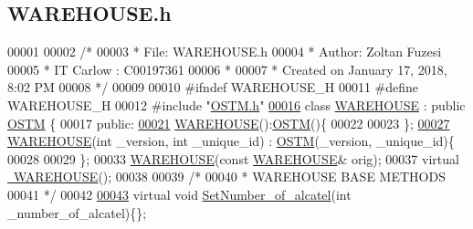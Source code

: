 \hypertarget{_w_a_r_e_h_o_u_s_e_8h_source}{}\subsection{W\+A\+R\+E\+H\+O\+U\+S\+E.\+h}

\begin{DoxyCode}
00001 
00002 \textcolor{comment}{/* }
00003 \textcolor{comment}{ * File:   WAREHOUSE.h}
00004 \textcolor{comment}{* Author: Zoltan Fuzesi}
00005 \textcolor{comment}{ * IT Carlow : C00197361}
00006 \textcolor{comment}{ *}
00007 \textcolor{comment}{ * Created on January 17, 2018, 8:02 PM}
00008 \textcolor{comment}{ */}
00009 
00010 \textcolor{preprocessor}{#ifndef WAREHOUSE\_H}
00011 \textcolor{preprocessor}{#define WAREHOUSE\_H}
00012 \textcolor{preprocessor}{#include "\hyperlink{_o_s_t_m_8h}{OSTM.h}"}
\hypertarget{_w_a_r_e_h_o_u_s_e_8h_source.tex_l00016}{}\hyperlink{class_w_a_r_e_h_o_u_s_e}{00016} \textcolor{keyword}{class }\hyperlink{class_w_a_r_e_h_o_u_s_e}{WAREHOUSE} : \textcolor{keyword}{public} \hyperlink{class_o_s_t_m}{OSTM} \{
00017 \textcolor{keyword}{public}:
\hypertarget{_w_a_r_e_h_o_u_s_e_8h_source.tex_l00021}{}\hyperlink{class_w_a_r_e_h_o_u_s_e_a7a924d389af91f54ed0e1d1d8d56ec57_a7a924d389af91f54ed0e1d1d8d56ec57}{00021}     \hyperlink{class_w_a_r_e_h_o_u_s_e_a7a924d389af91f54ed0e1d1d8d56ec57_a7a924d389af91f54ed0e1d1d8d56ec57}{WAREHOUSE}():\hyperlink{class_o_s_t_m}{OSTM}()\{
00022         
00023     \};
\hypertarget{_w_a_r_e_h_o_u_s_e_8h_source.tex_l00027}{}\hyperlink{class_w_a_r_e_h_o_u_s_e_a91a50ed8f6eeb344b1785f750532b18a_a91a50ed8f6eeb344b1785f750532b18a}{00027}     \hyperlink{class_w_a_r_e_h_o_u_s_e_a91a50ed8f6eeb344b1785f750532b18a_a91a50ed8f6eeb344b1785f750532b18a}{WAREHOUSE}(\textcolor{keywordtype}{int} \_version, \textcolor{keywordtype}{int} \_unique\_id) : \hyperlink{class_o_s_t_m}{OSTM}(\_version, \_unique\_id)\{
00028         
00029     \};
00033     \hyperlink{class_w_a_r_e_h_o_u_s_e_a7a924d389af91f54ed0e1d1d8d56ec57_a7a924d389af91f54ed0e1d1d8d56ec57}{WAREHOUSE}(\textcolor{keyword}{const} \hyperlink{class_w_a_r_e_h_o_u_s_e}{WAREHOUSE}& orig);
00037     \textcolor{keyword}{virtual} \hyperlink{class_w_a_r_e_h_o_u_s_e_ad5aa686839d7be9bfea33d469c58086b_ad5aa686839d7be9bfea33d469c58086b}{~WAREHOUSE}();
00038     
00039     \textcolor{comment}{/*}
00040 \textcolor{comment}{     * WAREHOUSE BASE METHODS}
00041 \textcolor{comment}{     */}
00042     
\hypertarget{_w_a_r_e_h_o_u_s_e_8h_source.tex_l00043}{}\hyperlink{class_w_a_r_e_h_o_u_s_e_a91b45d7d40a154308644a9f2b1767d28_a91b45d7d40a154308644a9f2b1767d28}{00043}     \textcolor{keyword}{virtual} \textcolor{keywordtype}{void} \hyperlink{class_w_a_r_e_h_o_u_s_e_a91b45d7d40a154308644a9f2b1767d28_a91b45d7d40a154308644a9f2b1767d28}{SetNumber\_of\_alcatel}(\textcolor{keywordtype}{int} \_number\_of\_alcatel)\{\};

\end{DoxyCode}
